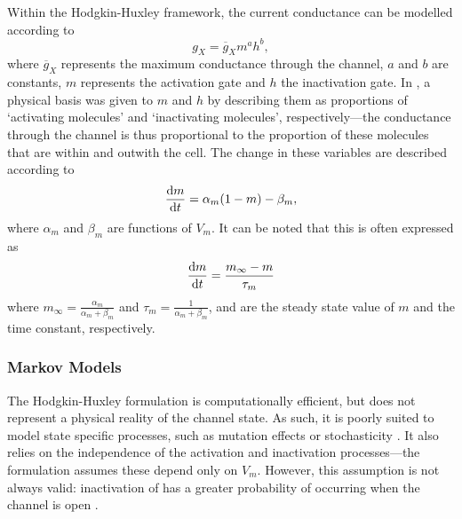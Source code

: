 \documentclass[../thesis-main.tex]{subfiles}
\begin{document}
 Within the Hodgkin-Huxley framework, the current conductance can be modelled according to
 \begin{equation}
  g_X = \overline{g}_Xm^a h^b,
 \end{equation}
 where $\overline{g}_X$ represents the maximum conductance through the channel, $a$ and $b$ are constants, $m$ represents the activation gate and $h$ the inactivation gate. In \citet{Hodgkin1952}, a physical basis was given to $m$ and $h$ by describing them as proportions of `activating molecules' and `inactivating molecules', respectively---the conductance through the channel is thus proportional to the proportion of these molecules that are within and outwith the cell. The change in these variables are described according to
 \begin{equation}
  \frac{\textnormal{d}m}{\textnormal{d}t} = \alpha_m(1-m)-\beta_m,
 \end{equation}
 where $\alpha_m$ and $\beta_m$ are functions of $V_m$. It can be noted that this is often expressed as
 \begin{equation}
  \frac{\textnormal{d}m}{\textnormal{d}t} = \frac{m_\infty-m}{\tau_m}
 \end{equation}
 where $m_\infty=\frac{\alpha_m}{\alpha_m+\beta_m}$ and $\tau_m=\frac{1}{\alpha_m+\beta_m}$, and are the steady state value of $m$ and the time constant, respectively.
 
 \subsubsection{Markov Models}
 \label{subsubsec:markov}
 The Hodgkin-Huxley formulation is computationally efficient, but does not represent a physical reality of the channel state. As such, it is poorly suited to model state specific processes, such as mutation effects or stochasticity \citep{Adeniran2011}. It also relies on the independence of the activation and inactivation processes---the formulation assumes these depend only on $V_m$. However, this assumption is not always valid: inactivation of \ina{} has a greater probability of occurring when the channel is open \citep{Bezanilla1977, Armstrong1977}.
 
\end{document}

